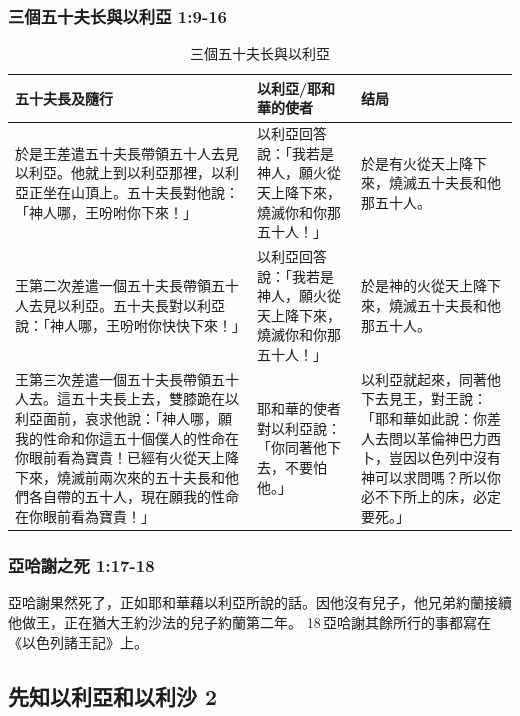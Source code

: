 \subsubsection{三個五十夫长與以利亞 1:9-16}
\begin{table}[H]
\centering
\begin{tabular}{p{7.5cm}|p{3.85cm}|p{4.25cm}}\hline\hline
五十夫長及隨行&以利亞/耶和華的使者&结局\\\hline\hline
於是王差遣五十夫長帶領五十人去見以利亞。他就上到以利亞那裡，以利亞正坐在山頂上。五十夫長對他說：「神人哪，王吩咐你下來！」 &以利亞回答說：「我若是神人，願火從天上降下來，燒滅你和你那五十人！」&於是有火從天上降下來，燒滅五十夫長和他那五十人。 \\\hline
王第二次差遣一個五十夫長帶領五十人去見以利亞。五十夫長對以利亞說：「神人哪，王吩咐你快快下來！」&以利亞回答說：「我若是神人，願火從天上降下來，燒滅你和你那五十人！」&於是神的火從天上降下來，燒滅五十夫長和他那五十人。 \\\hline
王第三次差遣一個五十夫長帶領五十人去。這五十夫長上去，雙膝跪在以利亞面前，哀求他說：「神人哪，願我的性命和你這五十個僕人的性命在你眼前看為寶貴！已經有火從天上降下來，燒滅前兩次來的五十夫長和他們各自帶的五十人，現在願我的性命在你眼前看為寶貴！」&耶和華的使者對以利亞說：「你同著他下去，不要怕他。」&以利亞就起來，同著他下去見王，對王說：「耶和華如此說：你差人去問以革倫神巴力西卜，豈因以色列中沒有神可以求問嗎？所以你必不下所上的床，必定要死。」\\\hline
\end{tabular}
\caption{三個五十夫长與以利亞}
\end{table}


\subsubsection{亞哈謝之死 1:17-18}
亞哈謝果然死了，正如耶和華藉以利亞所說的話。因他沒有兒子，他兄弟約蘭接續他做王，正在猶大王約沙法的兒子約蘭第二年。 18 亞哈謝其餘所行的事都寫在《以色列諸王記》上。

\subsection{先知以利亞和以利沙 2}
